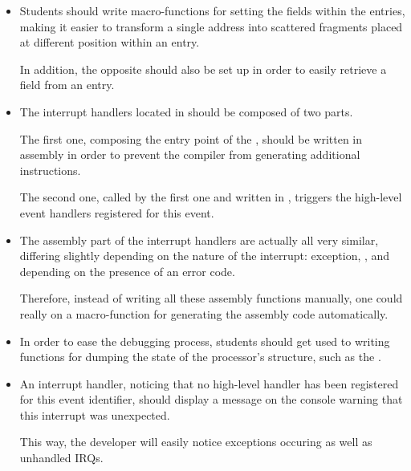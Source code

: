 \begin{itemize}
  \item
    Students should write macro-functions for setting the fields within
    the  entries, making it easier to transform a single address
    into scattered fragments placed at different position within an entry.

    \-

    In addition, the opposite should also be set up in order to easily
    retrieve a field from an  entry.
  \item
    The interrupt handlers located in  should be
    composed of two parts.

    \-

    The first one, composing the entry point of the , should be written in assembly in order to prevent
    the compiler from generating additional instructions.

    \-

    The second one, called by the first one and written in , triggers
    the high-level event handlers registered for this event.
  \item
    The assembly part of the interrupt handlers are actually all very similar,
    differing slightly depending on the nature of the interrupt: exception,
    ,  \etc{} and depending on the presence of an
    error code.

    \-

    Therefore, instead of writing all these assembly functions manually,
    one could really on a macro-function for generating the assembly
    code automatically.
  \item
    In order to ease the debugging process, students should get used to
    writing functions for dumping the state of the processor's structure,
    such as the .
  \item
    An interrupt handler, noticing that no high-level handler has been
    registered for this event identifier, should display a message on the
    console warning that this interrupt was unexpected.

    \-

    This way, the developer will easily notice exceptions occuring as well
    as unhandled IRQs.
\end{itemize}

